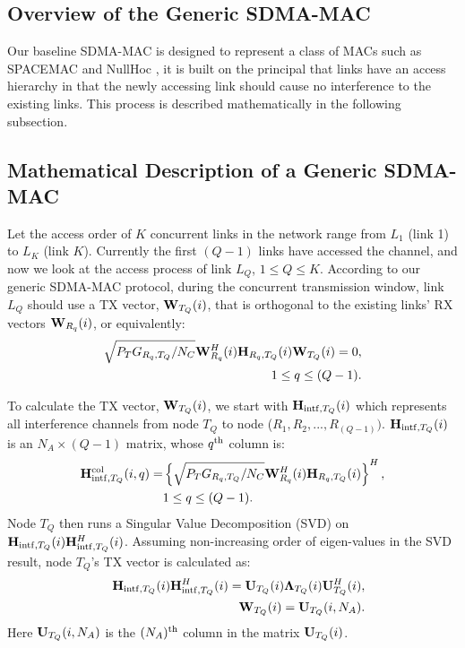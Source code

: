 \documentclass[journal, final]{IEEEtran}
\begin{document}
\subsection{Overview of the Generic SDMA-MAC}
Our baseline SDMA-MAC is designed to represent a class of MACs such as
SPACEMAC \cite{1_SPACEMAC, 2_MIMOMAN} and NullHoc \cite{3_NULLHOC, 4_nullhoc}, it is built on the principal that links
have an access hierarchy in that the newly accessing link should cause no interference to the existing links. This
process is described mathematically in the following subsection.

\subsection{Mathematical Description of a Generic SDMA-MAC}
Let the access order of $K$ concurrent links in the network range from $L_1
$ (link 1) to $L_K $ (link $K$). Currently the first $(Q - 1)$ links have
accessed the channel, and now we look at the access process of link $L_Q $,
$1 \le Q \le K$. According to our generic SDMA-MAC protocol, during the
concurrent transmission window, link $L_Q $ should use a TX vector, ${\rm
{\bf W}}_{T_Q } (i)$, that is orthogonal to the existing links' RX vectors
${\rm {\bf W}}_{R_q } (i)$, or equivalently:
\begin{eqnarray}
\label{eq1}
{\sqrt {P_T
G_{R_q ,T_Q } / N_C } {\rm {\bf W}}_{R_q }^H (i){\rm {\bf H}}_{R_q ,T_Q }
(i)}{\rm {\bf W}}_{T_Q }(i)=0, \nonumber\\
1 \le q \le (Q - 1).
\end{eqnarray}

To calculate the TX vector, ${\rm {\bf W}}_{T_Q } (i)$, we start with ${\rm
{\bf H}}_{{\rm intf},T_Q } (i)$ which represents all interference channels
from node $T_Q $ to node ($R_1 ,R_2 ,...,R_{(Q - 1)} )$. ${\rm {\bf
H}}_{{\rm intf},T_Q } (i)$ is an $N_A \times (Q - 1)$ matrix, whose
$q^{\rm{th}}$ column is:
\begin{align}
\label{eq2}
{\rm {\bf H}}_{{\rm intf},T_Q }^{{\rm col}} (i,q) =& \left\{ {\sqrt {P_T
G_{R_q ,T_Q } / N_C } {\rm {\bf W}}_{R_q }^H (i){\rm {\bf H}}_{R_q ,T_Q }
(i)} \right\}^H,\notag\\
&1 \le q \le (Q - 1).
\end{align}
Node $T_Q $ then runs a Singular Value Decomposition (SVD) on ${\rm {\bf
H}}_{{\rm intf},T_Q } (i){\rm {\bf H}}_{{\rm intf},T_Q }^H (i)$. Assuming non-increasing order of eigen-values in the SVD result, node $T_Q
$'s TX vector is calculated as:
\begin{eqnarray}
\label{eq3}
&&{\rm {\bf H}}_{{\rm intf},T_Q } (i){\rm {\bf H}}_{{\rm intf},T_Q }^H (i) =
{\rm {\bf U}}_{T_Q } (i){\rm {\bf \Lambda}} _{T_Q } (i){\rm {\bf U}}_{T_Q }^H (i), \\
&&{\rm {\bf W}}_{T_Q } (i) = {\rm {\bf U}}_{T_Q } (i,N_A ).
\end{eqnarray}
Here ${\rm {\bf U}}_{T_Q } (i,N_A )$ is the $(N_A) ^{{\rm th}}$ column in the
matrix ${\rm {\bf U}}_{T_Q } (i)$.
\end{document}
